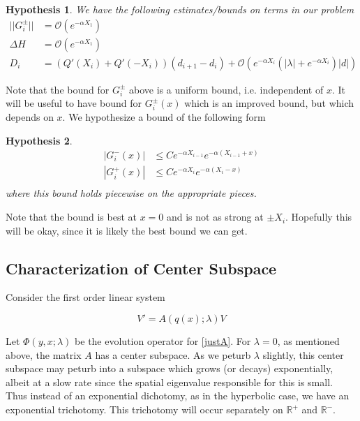 \documentclass[12pt]{article}
\def\R{{\mathbb R}}
\newtheorem{hypothesis}{Hypothesis}
\begin{document}
\begin{hypothesis}\label{problembounds}
We have the following estimates/bounds on terms in our problem
\begin{align*}
||G_i^\pm|| &= \mathcal{O}(e^{-\alpha X_1}) \\
\Delta H &= \mathcal{O}(e^{-\alpha X_1}) \\
D_i &= ( Q'(X_i) + Q'(-X_i))(d_{i+1} - d_i ) + \mathcal{O} \left( e^{-\alpha X_i} \left( |\lambda| +  e^{-\alpha X_i}  \right) |d| \right)
\end{align*}
\end{hypothesis}

Note that the bound for $G_i^\pm$ above is a uniform bound, i.e. independent of $x$. It will be useful to have bound for $G_i^\pm(x)$ which is an improved bound, but which depends on $x$. We hypothesize a bound of the following form

\begin{hypothesis}\label{Gbound}
\begin{align*}
|G_i^-(x)| &\leq C e^{-\alpha X_{i-1}} e^{-\alpha(X_{i-1} + x) } \\
|G_i^+(x)| &\leq C e^{-\alpha X_i} e^{-\alpha(X_i - x) } \\
\end{align*}
where this bound holds piecewise on the appropriate pieces.
\end{hypothesis}

Note that the bound is best at $x = 0$ and is not as strong at $\pm X_i$. Hopefully this will be okay, since it is likely the best bound we can get.

\subsection{Characterization of Center Subspace}

Consider the first order linear system

\begin{equation}\label{justA}
V' = A(q(x); \lambda) V
\end{equation}

Let $\Phi(y, x; \lambda)$ be the evolution operator for \eqref{justA}. For $\lambda = 0$, as mentioned above, the matrix $A$ has a center subspace. As we peturb $\lambda$ slightly, this center subspace may peturb into a subspace which grows (or decays) exponentially, albeit at a slow rate since the spatial eigenvalue responsible for this is small. Thus instead of an exponential dichotomy, as in the hyperbolic case, we have an exponential trichotomy. This trichotomy will occur separately on $\R^+$ and $\R^-$.\\
\end{document}
